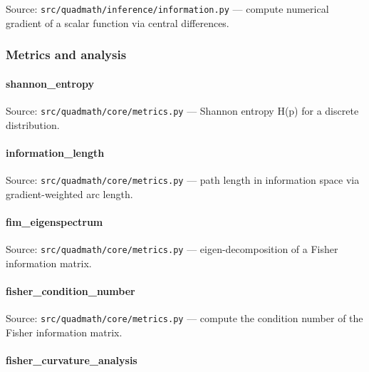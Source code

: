 \documentclass[
  10pt,
]{article}
\newcommand{\passthrough}[1]{#1}
\renewcommand{\texttt}[1]{%
    \colorbox{codebg}{\color{codefg}\ttfamily #1}%
}
\begin{document}
Source: \passthrough{\lstinline!src/quadmath/inference/information.py!}
--- compute numerical gradient of a scalar function via central
differences.

\subsubsection{Metrics and analysis}\label{code:metrics}

\paragraph{\texorpdfstring{\texttt{shannon\_entropy}}{shannon\_entropy}}\label{code:shannon_entropy}

Source: \passthrough{\lstinline!src/quadmath/core/metrics.py!} ---
Shannon entropy H(p) for a discrete distribution.

\paragraph{\texorpdfstring{\texttt{information\_length}}{information\_length}}\label{code:information_length}

Source: \passthrough{\lstinline!src/quadmath/core/metrics.py!} --- path
length in information space via gradient-weighted arc length.

\paragraph{\texorpdfstring{\texttt{fim\_eigenspectrum}}{fim\_eigenspectrum}}\label{code:fim_eigenspectrum}

Source: \passthrough{\lstinline!src/quadmath/core/metrics.py!} ---
eigen-decomposition of a Fisher information matrix.

\paragraph{\texorpdfstring{\texttt{fisher\_condition\_number}}{fisher\_condition\_number}}\label{code:fisher_condition_number}

Source: \passthrough{\lstinline!src/quadmath/core/metrics.py!} ---
compute the condition number of the Fisher information matrix.

\paragraph{\texorpdfstring{\texttt{fisher\_curvature\_analysis}}{fisher\_curvature\_analysis}}\label{code:fisher_curvature_analysis}
\end{document}
